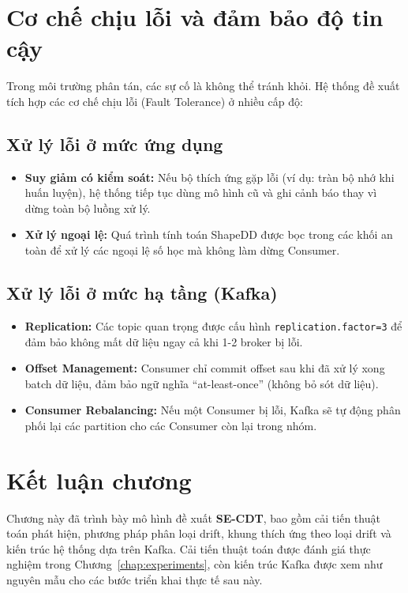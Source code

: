 \section{Cơ chế chịu lỗi và đảm bảo độ tin cậy}

Trong môi trường phân tán, các sự cố là không thể tránh khỏi. Hệ thống đề xuất tích hợp các cơ chế chịu lỗi (Fault Tolerance) ở nhiều cấp độ:

\subsection{Xử lý lỗi ở mức ứng dụng}
\begin{itemize}
	\item \textbf{Suy giảm có kiểm soát:} Nếu bộ thích ứng gặp lỗi (ví dụ: tràn bộ nhớ khi huấn luyện), hệ thống tiếp tục dùng mô hình cũ và ghi cảnh báo thay vì dừng toàn bộ luồng xử lý.
	\item \textbf{Xử lý ngoại lệ:} Quá trình tính toán ShapeDD được bọc trong các khối an toàn để xử lý các ngoại lệ số học mà không làm dừng Consumer.
\end{itemize}

\subsection{Xử lý lỗi ở mức hạ tầng (Kafka)}
\begin{itemize}
	\item \textbf{Replication:} Các topic quan trọng được cấu hình \texttt{replication.factor=3} để đảm bảo không mất dữ liệu ngay cả khi 1-2 broker bị lỗi.
	\item \textbf{Offset Management:} Consumer chỉ commit offset sau khi đã xử lý xong batch dữ liệu, đảm bảo ngữ nghĩa ``at-least-once'' (không bỏ sót dữ liệu).
	\item \textbf{Consumer Rebalancing:} Nếu một Consumer bị lỗi, Kafka sẽ tự động phân phối lại các partition cho các Consumer còn lại trong nhóm.
\end{itemize}

\section{Kết luận chương}
Chương này đã trình bày mô hình đề xuất \textbf{SE-CDT}, bao gồm cải tiến thuật toán phát hiện, phương pháp phân loại drift, khung thích ứng theo loại drift và kiến trúc hệ thống dựa trên Kafka. Cải tiến thuật toán được đánh giá thực nghiệm trong Chương~\ref{chap:experiments}, còn kiến trúc Kafka được xem như nguyên mẫu cho các bước triển khai thực tế sau này.
